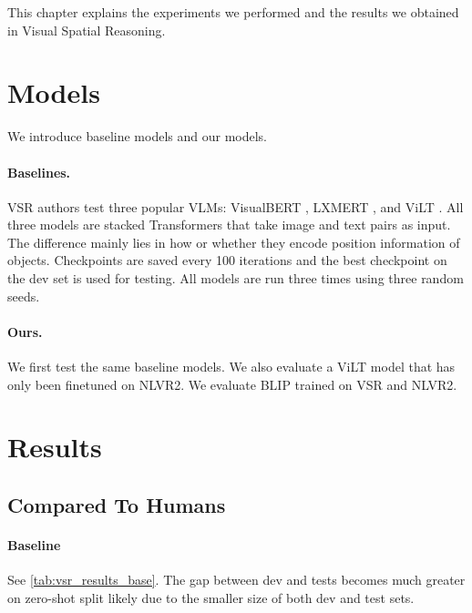 This chapter explains the experiments we performed and the results we obtained in Visual Spatial Reasoning.

\section{Models} \label{sec:vsr_models}

We introduce baseline models and our models.

\paragraph{Baselines.} VSR authors \cite{liu2022visual} test three popular VLMs: VisualBERT \cite{li2019visualbert}, 
LXMERT \cite{tan2020lxmert}, and
ViLT \cite{kim2021vilt}. All three models are stacked Transformers \cite{vaswani2017attention} that take image and text pairs as input. The difference mainly lies in how or whether they encode position information of objects. Checkpoints are saved every 100 iterations and the best checkpoint on the dev set is used for testing. All models are run three times using three random seeds.

\paragraph{Ours.} We first test the same baseline models. We also evaluate a ViLT model that has only been finetuned on NLVR2. We evaluate BLIP \cite{li2022blip} trained on VSR and NLVR2.

\section{Results} \label{sec:vsr_results}

\subsection{Compared To Humans}

\paragraph{Baseline}

See \cref{tab:vsr_results_base}. The gap between dev and tests becomes much greater on zero-shot split likely due to the smaller size of both dev and test sets.

